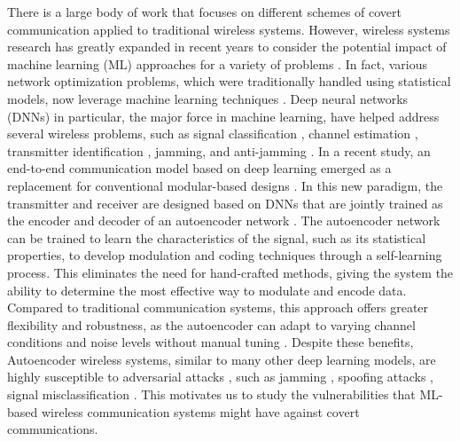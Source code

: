 There is a large body of work that focuses on different schemes of covert communication applied to traditional wireless systems. However, wireless systems research has greatly expanded in recent years to consider the potential impact of machine learning (ML) approaches for a variety of problems \cite{wang2017deep}. In fact, various network optimization problems, which were traditionally handled using statistical models, now leverage machine learning techniques \cite{zhu2020toward}. Deep neural networks (DNNs) in particular, the major force in machine learning, have helped address several wireless problems, such as signal classification \cite{o2016radio, o2017introduction, wu2020deep, makkuva2021ko}, channel estimation \cite{soltani2019deep}, transmitter identification \cite{roy2019rfal, hanna2019deep}, jamming, and anti-jamming \cite{arjoune2020novel, bahramali2021robust}. In a recent study, an end-to-end communication model based on deep learning emerged as a replacement for conventional modular-based designs \cite{o2017introduction}. In this new paradigm, the transmitter and receiver are designed based on DNNs that are jointly trained as the encoder and decoder of an autoencoder network \cite{o2017introduction}. The autoencoder network can be trained to learn the characteristics of the signal, such as its statistical properties, to develop modulation and coding techniques through a self-learning process. This eliminates the need for hand-crafted methods, giving the system the ability to determine the most effective way to modulate and encode data. Compared to traditional communication systems, this approach offers greater flexibility and robustness, as the autoencoder can adapt to varying channel conditions and noise levels without manual tuning \cite{zou2021channel}. Despite these benefits, Autoencoder wireless systems, similar to many other deep learning models, are highly susceptible to adversarial attacks \cite{chakraborty2018adversarial}, such as jamming \cite{bahramali2021robust}, spoofing attacks \cite{shi2020generative}, signal misclassification \cite{sadeghi2019physical}. This motivates us to study the vulnerabilities that ML-based wireless communication systems might have against covert communications.

